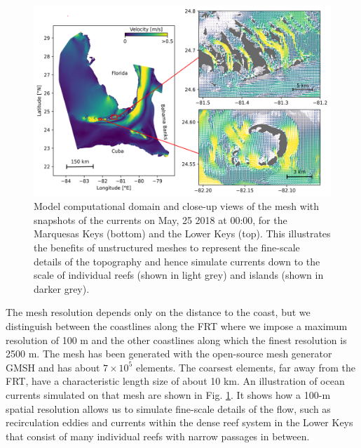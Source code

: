 \documentclass[utf8]{frontiersSCNS}
\begin{document}
\begin{figure}
    \centering
    \includegraphics[width=.95\textwidth]{figures/vel.png}
    \caption{Model computational domain and close-up views of the mesh with snapshots of the currents on May, 25 2018 at 00:00, for the Marquesas Keys (bottom) and the Lower Keys (top). This illustrates the benefits of unstructured meshes to represent the fine-scale details of the topography and hence simulate currents down to the scale of individual reefs (shown in light grey) and islands (shown in darker grey).}
    \label{fig:setup}
\end{figure}

The mesh resolution depends only on the distance to the coast, but we distinguish between the coastlines along the FRT where we impose a maximum resolution of 100 m and the other coastlines along which the finest resolution is 2500 m. The mesh has been generated with the open-source mesh generator GMSH \citep{Geuzaine2009} and has about $7 \times 10^5$ elements. The coarsest elements, far away from the FRT, have a characteristic length size of about 10 km. An illustration of ocean currents simulated on that mesh are shown in Fig. \ref{fig:setup}. It shows how a 100-m spatial resolution allows us to simulate fine-scale details of the flow, such as recirculation eddies and currents within the dense reef system in the Lower Keys that consist of many individual reefs with narrow passages in between. 
\end{document}
